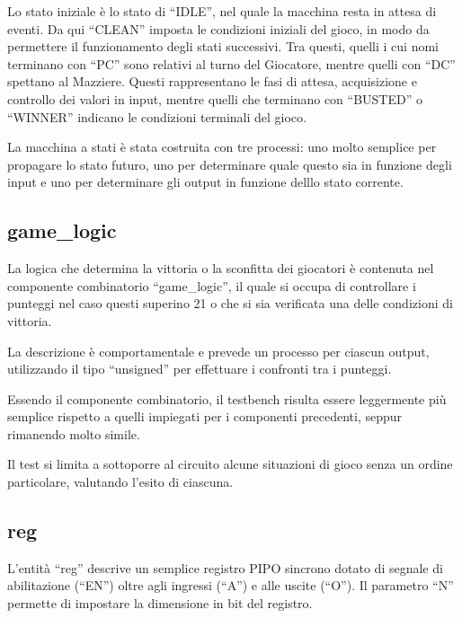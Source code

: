 \documentclass [11pt,a4paper,oneside,draft]{article}
\begin{document}
Lo stato iniziale è lo stato di ``IDLE'', nel quale la macchina resta
in attesa di eventi. Da qui ``CLEAN'' imposta le condizioni iniziali
del gioco, in modo da permettere il funzionamento degli stati successivi.
Tra questi, quelli i cui nomi
terminano con ``PC'' sono relativi al turno del Giocatore, mentre 
quelli con ``DC'' spettano al Mazziere. Questi rappresentano le fasi
di attesa, acquisizione e controllo dei valori in input, mentre quelli
che terminano con ``BUSTED'' o ``WINNER'' indicano le condizioni 
terminali del gioco.



La macchina a stati è stata costruita con tre processi: uno molto 
semplice per propagare lo stato futuro, uno per determinare quale
questo sia in funzione degli input e uno per determinare gli output
in funzione delllo stato corrente.



\subsection{game\_logic}

La logica che determina la vittoria o la sconfitta dei giocatori è
contenuta nel componente combinatorio ``game\_logic'', il quale
si occupa di controllare i punteggi nel caso questi superino 21 o
che si sia verificata una delle condizioni di vittoria.



La descrizione è comportamentale e prevede un processo per ciascun
output, utilizzando il tipo ``unsigned'' per effettuare i confronti
tra i punteggi.



Essendo il componente combinatorio, il testbench risulta essere
leggermente più semplice rispetto a quelli impiegati per i componenti
precedenti, seppur rimanendo molto simile.



Il test si limita a sottoporre al circuito alcune situazioni di 
gioco senza un ordine particolare, valutando l'esito di ciascuna.

\subsection{reg}

L'entità ``reg'' descrive un semplice registro PIPO sincrono dotato di 
segnale di abilitazione (``EN'') oltre agli ingressi (``A'') e alle
uscite (``O''). Il parametro ``N'' permette di impostare la dimensione
in bit del registro.
\end{document}
